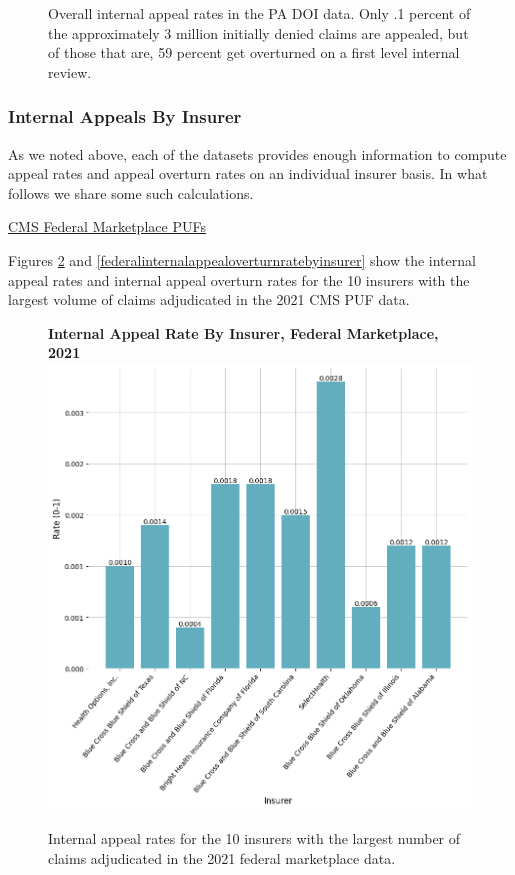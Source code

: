 \documentclass[12pt, a4paper,twoside]{report}
\theoremstyle{plain} %
\theoremstyle{definition} %
\theoremstyle{remark} %
\numberwithin{equation}{chapter}
\begin{document}
\begin{figure}[h!]
\begin{subfigure}[b]{0.49\textwidth}
			\end{subfigure}
			\caption{Overall internal appeal rates in the PA DOI data. Only .1 percent of the approximately 3 million initially denied claims are appealed, but of those that are, 59 percent get overturned on a first level internal review.}
			\label{painternalappealpie}
		\end{figure}
	
	\clearpage
		
				
		
		\subsubsection{Internal Appeals By Insurer}
		
		As we noted above, each of the datasets provides enough information to compute appeal rates and appeal overturn rates on an individual insurer basis. In what follows we share some such calculations.
		
		\underline{CMS Federal Marketplace PUFs}
		
		Figures \ref{federalinternalappealratebyinsurer} and \ref{federalinternalappealoverturnratebyinsurer} show the internal appeal rates and internal appeal overturn rates for the 10 insurers with the largest volume of claims adjudicated in the 2021 CMS PUF data.
		
		
		\begin{figure}[h!]
			\centering
			\textbf{Internal Appeal Rate By Insurer, Federal Marketplace, 2021}
			\includegraphics[width=.8\columnwidth]{images/cms_puf/internal_appeal_rate_by_insurer.png}
			\caption{Internal appeal rates for the 10 insurers with the largest number of claims adjudicated in the 2021 federal marketplace data.}
			\label{federalinternalappealratebyinsurer}
		\end{figure}
	
\end{document}
